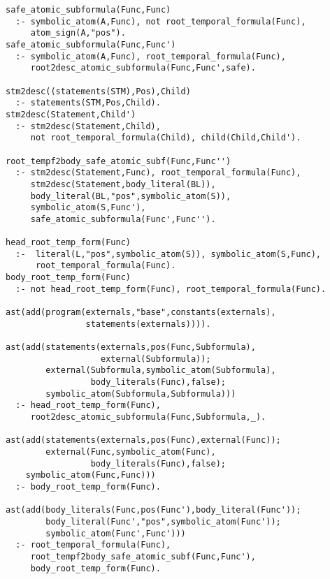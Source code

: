 \begin{center}
\begin{minipage}{\linewidth}
  \begin{lstlisting}[]
safe_atomic_subformula(Func,Func) 
  :- symbolic_atom(A,Func), not root_temporal_formula(Func), 
     atom_sign(A,"pos").
safe_atomic_subformula(Func,Func')
  :- symbolic_atom(A,Func), root_temporal_formula(Func),
     root2desc_atomic_subformula(Func,Func',safe).

stm2desc((statements(STM),Pos),Child) 
  :- statements(STM,Pos,Child).
stm2desc(Statement,Child') 
  :- stm2desc(Statement,Child), 
     not root_temporal_formula(Child), child(Child,Child').

root_tempf2body_safe_atomic_subf(Func,Func'')
  :- stm2desc(Statement,Func), root_temporal_formula(Func), 
     stm2desc(Statement,body_literal(BL)), 
     body_literal(BL,"pos",symbolic_atom(S)), 
     symbolic_atom(S,Func'), 
     safe_atomic_subformula(Func',Func'').

head_root_temp_form(Func)
  :-  literal(L,"pos",symbolic_atom(S)), symbolic_atom(S,Func),
      root_temporal_formula(Func).
body_root_temp_form(Func) 
  :- not head_root_temp_form(Func), root_temporal_formula(Func).

ast(add(program(externals,"base",constants(externals),
                statements(externals)))).

ast(add(statements(externals,pos(Func,Subformula),
                   external(Subformula));
        external(Subformula,symbolic_atom(Subformula),
                 body_literals(Func),false);
        symbolic_atom(Subformula,Subformula)))
  :- head_root_temp_form(Func), 
     root2desc_atomic_subformula(Func,Subformula,_).

ast(add(statements(externals,pos(Func),external(Func));
        external(Func,symbolic_atom(Func),
                 body_literals(Func),false);
	symbolic_atom(Func,Func)))
  :- body_root_temp_form(Func).

ast(add(body_literals(Func,pos(Func'),body_literal(Func'));
        body_literal(Func',"pos",symbolic_atom(Func'));
        symbolic_atom(Func',Func')))
  :- root_temporal_formula(Func), 
     root_tempf2body_safe_atomic_subf(Func,Func'), 
     body_root_temp_form(Func).
\end{lstlisting}
\end{minipage}
\end{center}
